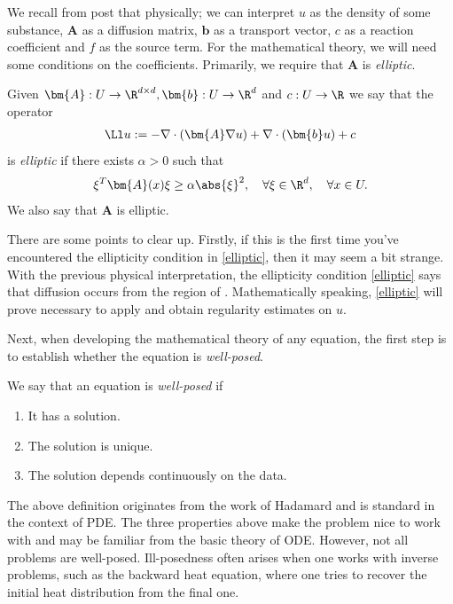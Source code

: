 \documentclass[
    a4paper,
    DIV=14,
    abstract=true,
    numbers=noenddot
]{scrartcl}
\begin{document}
We recall from post  that physically; we can interpret $u$ as the density of some substance, $\bm{A}$ as a diffusion matrix, $\bm{b}$ as a transport vector, $c$ as a reaction coefficient and $f$ as the source term. For the mathematical theory, we will need some conditions on the coefficients. Primarily, we require that $\bm{A}$ is \emph{elliptic}.
\begin{definition}[Ellipticity]
    Given $\bm{A}: U \to \R^{d \times d}, \bm{b}: U \to \R^d$ and $c:U \to \R$ we say that the operator
    \begin{align}\label{operator}
        \Ll u:= -\nabla \cdot (\bm{A} \nabla u)+ \nabla \cdot (\bm{b} u)+c\end{align}
    is \emph{elliptic} if there exists $\alpha>0$ such that
    \begin{align}\label{elliptic}
        \xi ^T\bm{A}(x) \xi \geq \alpha \abs{\xi }^2 , \quad\forall \xi \in \R^d , \quad\forall x \in U .
    \end{align}
    We also say that $\bm{A}$ is elliptic.
\end{definition}
There are some points to clear up. Firstly, if this is the first time you've encountered the ellipticity condition in \eqref{elliptic}, then it may seem a bit strange. With the previous physical interpretation, the ellipticity condition \eqref{elliptic} says that diffusion occurs from the region of . Mathematically speaking, \eqref{elliptic} will prove necessary to apply  and obtain regularity estimates on $u$. 


Next, when developing the mathematical theory of any equation, the first step is to establish whether the equation is \emph{well-posed}.
\begin{definition}\label{well-posedness} We say that an equation is \emph{well-posed} if
    \begin{enumerate}
        \item It has a solution.
        \item The solution is unique.
        \item The solution depends continuously on the data.
    \end{enumerate}
\end{definition}
The above definition originates from the work of Hadamard and is standard in the context of PDE. The three properties above make the problem nice to work with and may be familiar from the basic theory of ODE. However, not all problems are well-posed. Ill-posedness often arises when one works with inverse problems, such as the backward heat equation, where one tries to recover the initial heat distribution from the final one.
\end{document}
